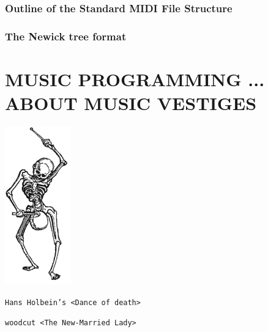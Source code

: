 \documentclass{book}
\begin{document}
\newpage
\section{Outline of the Standard MIDI File Structure}
\label{infomidi}


\newpage
\section{The Newick tree format}
\label{nwdoc}


\part[Music Programming ... about music vestiges]{MUSIC PROGRAMMING ... ABOUT MUSIC VESTIGES}

\thispagestyle{empty}



\thispagestyle{empty}





\begin{titlepage} 
\clearpage
\ifodd\thepage\hbox{}\newpage\else\fi%
\thispagestyle{empty}

\pagecolor{aureolin!30}

\vspace*{\baselineskip} 	
	
	\vspace*{0.167\textheight} 
	
\centerline{\includegraphics[scale=0.8]{img/logo}}
\vspace{.5cm}
  
\centerline{  {\tiny  \texttt{Hans Holbein's <Dance of death>} }}
\vspace{-0.2cm} 
\centerline{  {\tiny  \texttt{woodcut <The New-Married Lady>} }}

\end{titlepage}
\end{document}
